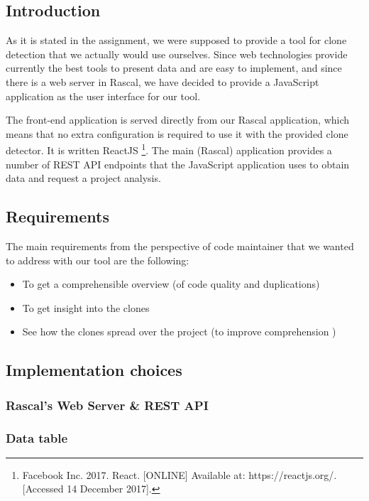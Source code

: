 \documentclass{uva-inf-article}
\begin{document}
\subsection{Introduction}
As it is stated in the assignment, we were supposed to provide a tool for clone detection that we actually would use ourselves.  Since web technologies provide currently the best tools to present data and are easy to implement, and since there is a web server in Rascal, we have decided to provide a JavaScript application as the user interface for our tool. 

The front-end application is served directly from our Rascal application, which means that no extra configuration is required to use it with the provided clone detector. It is written ReactJS \footnote{Facebook Inc. 2017. React. [ONLINE] Available at: https://reactjs.org/. [Accessed 14 December 2017].
}. The main (Rascal) application provides a number of REST API endpoints that the JavaScript application uses to obtain data and request a project analysis. 

\subsection{Requirements}
The main requirements from the perspective of code maintainer that we wanted to address with our tool are the following: 

\begin{itemize}
    \item{To get a comprehensible overview (of code quality and duplications) }
    \item{To get insight into the clones}
    \item{See how the clones spread over the project (to improve comprehension ) }
\end{itemize}

\subsection{Implementation choices}

\subsubsection{Rascal's Web Server \& REST API}

\subsubsection{Data table}
\end{document}
